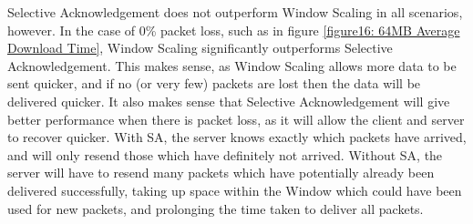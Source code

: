 \documentclass[12pt]{article}
\begin{document}
Selective Acknowledgement does not outperform Window Scaling in all scenarios, however.
In the case of 0\% packet loss, such as in figure \ref{figure16: 64MB Average Download Time}, Window Scaling significantly outperforms Selective Acknowledgement.
This makes sense, as Window Scaling allows more data to be sent quicker, and if no (or very few) packets are lost then the data will be delivered quicker.
It also makes sense that Selective Acknowledgement will give better performance when there is packet loss, as it will allow the client and server to recover quicker.
With SA, the server knows exactly which packets have arrived, and will only resend those which have definitely not arrived.
Without SA, the server will have to resend many packets which have potentially already been delivered successfully, taking up space within the Window which could have been used for new packets, and prolonging the time taken to deliver all packets. 
\end{document}
